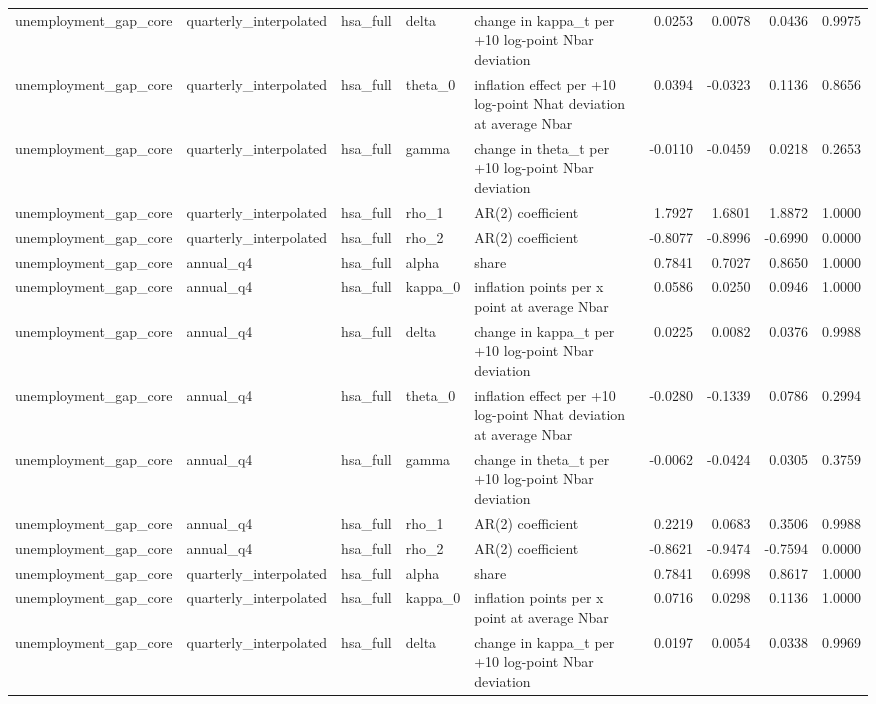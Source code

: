 \begin{tabular}{lllllrrrr}
unemployment\_gap\_core & quarterly\_interpolated & hsa\_full & delta & change in kappa\_t per +10 log-point Nbar deviation & 0.0253 & 0.0078 & 0.0436 & 0.9975 \\
unemployment\_gap\_core & quarterly\_interpolated & hsa\_full & theta\_0 & inflation effect per +10 log-point Nhat deviation at average Nbar & 0.0394 & -0.0323 & 0.1136 & 0.8656 \\
unemployment\_gap\_core & quarterly\_interpolated & hsa\_full & gamma & change in theta\_t per +10 log-point Nbar deviation & -0.0110 & -0.0459 & 0.0218 & 0.2653 \\
unemployment\_gap\_core & quarterly\_interpolated & hsa\_full & rho\_1 & AR(2) coefficient & 1.7927 & 1.6801 & 1.8872 & 1.0000 \\
unemployment\_gap\_core & quarterly\_interpolated & hsa\_full & rho\_2 & AR(2) coefficient & -0.8077 & -0.8996 & -0.6990 & 0.0000 \\
unemployment\_gap\_core & annual\_q4 & hsa\_full & alpha & share & 0.7841 & 0.7027 & 0.8650 & 1.0000 \\
unemployment\_gap\_core & annual\_q4 & hsa\_full & kappa\_0 & inflation points per x point at average Nbar & 0.0586 & 0.0250 & 0.0946 & 1.0000 \\
unemployment\_gap\_core & annual\_q4 & hsa\_full & delta & change in kappa\_t per +10 log-point Nbar deviation & 0.0225 & 0.0082 & 0.0376 & 0.9988 \\
unemployment\_gap\_core & annual\_q4 & hsa\_full & theta\_0 & inflation effect per +10 log-point Nhat deviation at average Nbar & -0.0280 & -0.1339 & 0.0786 & 0.2994 \\
unemployment\_gap\_core & annual\_q4 & hsa\_full & gamma & change in theta\_t per +10 log-point Nbar deviation & -0.0062 & -0.0424 & 0.0305 & 0.3759 \\
unemployment\_gap\_core & annual\_q4 & hsa\_full & rho\_1 & AR(2) coefficient & 0.2219 & 0.0683 & 0.3506 & 0.9988 \\
unemployment\_gap\_core & annual\_q4 & hsa\_full & rho\_2 & AR(2) coefficient & -0.8621 & -0.9474 & -0.7594 & 0.0000 \\
unemployment\_gap\_core & quarterly\_interpolated & hsa\_full & alpha & share & 0.7841 & 0.6998 & 0.8617 & 1.0000 \\
unemployment\_gap\_core & quarterly\_interpolated & hsa\_full & kappa\_0 & inflation points per x point at average Nbar & 0.0716 & 0.0298 & 0.1136 & 1.0000 \\
unemployment\_gap\_core & quarterly\_interpolated & hsa\_full & delta & change in kappa\_t per +10 log-point Nbar deviation & 0.0197 & 0.0054 & 0.0338 & 0.9969 \\

\end{tabular}
